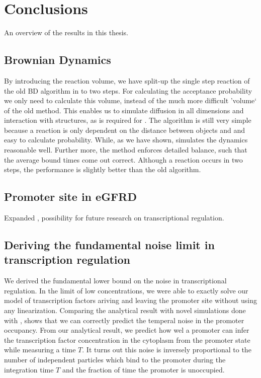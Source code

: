 \section{Conclusions}

An overview of the results in this thesis.

\subsection{Brownian Dynamics}
By introducing the reaction volume, we have split-up the single step reaction of the old BD algorithm in to two steps. For calculating the acceptance probability we only need to calculate this volume, instead of the much more difficult 'volume` of the old method. This enables us to simulate diffusion in all dimensions and interaction with structures, as is required for \GFRD. The algorithm is still very simple because a reaction is only dependent on the distance between objects and and easy to calculate probability. While, as we have shown, simulates the dynamics reasonable well. Further more, the method enforces detailed balance, such that the average bound times come out correct. Although a reaction occurs in two steps, the performance is slightly better than the old algorithm.



\subsection{Promoter site in eGFRD}
Expanded \GFRD, possibility for future research on transcriptional regulation. 



\subsection{Deriving the fundamental noise limit in transcription regulation}
We derived the fundamental lower bound on the noise in transcriptional regulation. In the limit of low concentrations, we were able to exactly solve our model of transcription factors ariving and leaving the promoter site without using any linearization. Comparing the analytical result with novel simulations done with \GFRD, shows that we can correctly predict the temperal noise in the promoter occupancy. From our analytical result, we predict how wel a promoter can infer the transcription factor concentration in the cytoplasm from the promoter state while measuring a time $T$. It turns out this noise is inversely proportional to the number of independent particles which bind to the promoter during the integration time $T$ and the fraction of time the promoter is unoccupied. 

